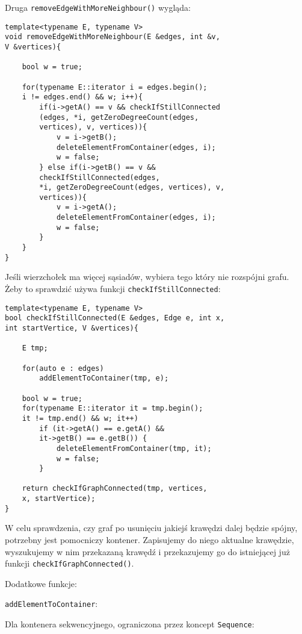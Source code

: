 \documentclass[11pt, a4paper]{article}
\begin{document}
Druga \verb#removeEdgeWithMoreNeighbour()# wygląda:
\begin{lstlisting}[frame=single]
template<typename E, typename V>
void removeEdgeWithMoreNeighbour(E &edges, int &v, 
V &vertices){
    
    bool w = true;
    
    for(typename E::iterator i = edges.begin(); 
    i != edges.end() && w; i++){
        if(i->getA() == v && checkIfStillConnected
        (edges, *i, getZeroDegreeCount(edges, 
        vertices), v, vertices)){
            v = i->getB();
            deleteElementFromContainer(edges, i);
            w = false;
        } else if(i->getB() == v && 
        checkIfStillConnected(edges, 
        *i, getZeroDegreeCount(edges, vertices), v, 
        vertices)){
            v = i->getA();
            deleteElementFromContainer(edges, i);
            w = false;
        }
    }
}
\end{lstlisting}
\newpage
Jeśli wierzchołek ma więcej sąsiadów, wybiera tego który nie rozspójni grafu. Żeby to sprawdzić używa funkcji \verb#checkIfStillConnected#:
\begin{lstlisting}[frame=single]
template<typename E, typename V>
bool checkIfStillConnected(E &edges, Edge e, int x, 
int startVertice, V &vertices){
    
    E tmp;

    for(auto e : edges)
        addElementToContainer(tmp, e);

    bool w = true;
    for(typename E::iterator it = tmp.begin(); 
    it != tmp.end() && w; it++)
		if (it->getA() == e.getA() && 
		it->getB() == e.getB()) {
            deleteElementFromContainer(tmp, it);
            w = false;
        }
        
    return checkIfGraphConnected(tmp, vertices, 
    x, startVertice);
}
\end{lstlisting}

W celu sprawdzenia, czy graf po usunięciu jakiejś krawędzi dalej będzie spójny, potrzebny jest pomocniczy kontener. Zapisujemy do niego aktualne krawędzie, wyszukujemy w nim przekazaną krawędź i przekazujemy go do istniejącej już funkcji \verb#checkIfGraphConnected()#.\newline

\noindent Dodatkowe funkcje:

\noindent \verb#addElementToContainer#:\newline

\noindent Dla kontenera sekwencyjnego, ograniczona przez koncept \verb#Sequence#:
\end{document}
